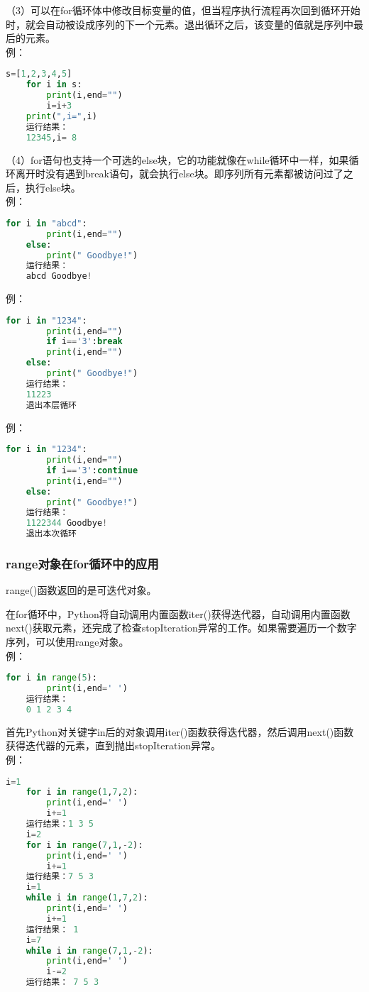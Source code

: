 \documentclass[11pt,a4paper]{article}
\begin{document}
（3）可以在for循环体中修改目标变量的值，但当程序执行流程再次回到循环开始时，就会自动被设成序列的下一个元素。退出循环之后，该变量的值就是序列中最后的元素。\\
例：
\begin{lstlisting}[language={Python}]
    s=[1,2,3,4,5]
    for i in s:
        print(i,end="")
        i=i+3
    print(",i=",i)
    运行结果：
    12345,i= 8
\end{lstlisting}
（4）for语句也支持一个可选的else块，它的功能就像在while循环中一样，如果循环离开时没有遇到break语句，就会执行else块。即序列所有元素都被访问过了之后，执行else块。\\
例：
\begin{lstlisting}[language={Python}]
    for i in "abcd":
        print(i,end="")
    else:
        print(" Goodbye!")
    运行结果：
    abcd Goodbye!
\end{lstlisting}
例：
\begin{lstlisting}[language={Python}]
    for i in "1234":
        print(i,end="")
        if i=='3':break
        print(i,end="")
    else:
        print(" Goodbye!")
    运行结果：
    11223
    退出本层循环
\end{lstlisting}
例：
\begin{lstlisting}[language={Python}]
    for i in "1234":
        print(i,end="")
        if i=='3':continue
        print(i,end="")
    else:
        print(" Goodbye!")
    运行结果：
    1122344 Goodbye!
    退出本次循环
\end{lstlisting}

\subsubsection{range对象在for循环中的应用}

range()函数返回的是可迭代对象。

在for循环中，Python将自动调用内置函数iter()获得迭代器，自动调用内置函数next()获取元素，还完成了检查stopIteration异常的工作。如果需要遍历一个数字序列，可以使用range对象。\\
例：
\begin{lstlisting}[language={Python}]
    for i in range(5):
        print(i,end=' ')
    运行结果：
    0 1 2 3 4
\end{lstlisting}
首先Python对关键字in后的对象调用iter()函数获得迭代器，然后调用next()函数获得迭代器的元素，直到抛出stopIteration异常。\\
例：
\begin{lstlisting}[language={Python}]
    i=1
    for i in range(1,7,2):
        print(i,end=' ')
        i+=1
    运行结果：1 3 5
    i=2
    for i in range(7,1,-2):
        print(i,end=' ')
        i+=1
    运行结果：7 5 3
    i=1
    while i in range(1,7,2):
        print(i,end=' ')
        i+=1
    运行结果： 1
    i=7
    while i in range(7,1,-2):
        print(i,end=' ')
        i-=2
    运行结果： 7 5 3
\end{lstlisting}
\end{document}
